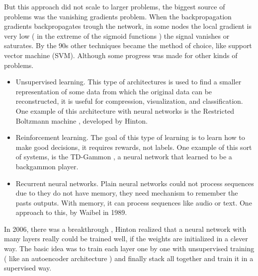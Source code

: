 But this approach did not scale to larger problems, the biggest source of problems was the vanishing gradients problem. When the backpropagation gradients backpropagates trough the network, in some nodes the local gradient is very low ( in the extreme of the sigmoid functions ) the signal vanishes or saturates. By the 90s other techniques became the method of choice, like support vector machine (SVM). Although some progress was made for other kinds of problems.

\begin{itemize}

\item Unsupervised learning. This type of architectures is used to find a smaller representation of some data from which the original data can be reconstructed, it is useful for compression, visualization, and classification. One example of this architecture with neural networks is the Restricted Boltzmann machine \cite{boltzmann}, developed by Hinton.
 
\item Reinforcement learning. The goal of this type of learning is to learn how to make good decisions, it requires rewards, not labels. One example of this sort of systems, is the TD-Gammon \cite{Gammon}, a neural network that learned to be a backgammon player.


\item Recurrent neural networks. Plain neural networks could not process sequences due to they do not have memory, they need mechanism to remember the pasts outputs. With memory, it can process sequences like audio or text. One approach to this, by Waibel \cite{Waibel} in 1989. 


\end{itemize}


In 2006, there was a breakthrough \cite{hinton06}, Hinton realized that a neural network with many layers really could be trained well, if the weights are initialized in a clever way. The basic idea was to train each layer one by one with unsupervised training ( like an autoencoder architecture ) and finally stack all together and train it in a supervised way. 

